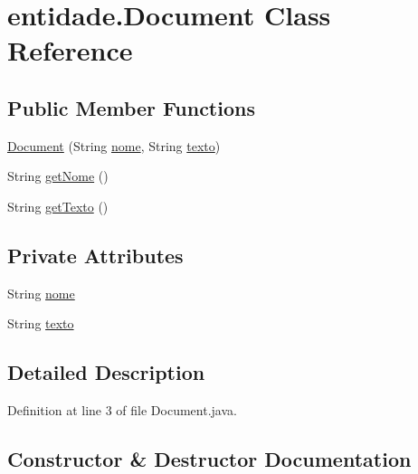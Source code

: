 \hypertarget{classentidade_1_1Document}{}\section{entidade.\+Document Class Reference}
\label{classentidade_1_1Document}
\subsection*{Public Member Functions}
\begin{DoxyCompactItemize}
\item 
\hyperlink{classentidade_1_1Document_a5c4d135e68423bdbfaf7584bc99669f7}{Document} (String \hyperlink{classentidade_1_1Document_ad19a8ea43a8ed7f3a418f7546fa4cd5c}{nome}, String \hyperlink{classentidade_1_1Document_a13324b3f331d617f95a64ad0ff958a94}{texto})
\item 
String \hyperlink{classentidade_1_1Document_aeeee0c94c00c921c2cc9b22bf2337f6c}{get\+Nome} ()
\item 
String \hyperlink{classentidade_1_1Document_abbdb123ed0ae443399b81060a7be9979}{get\+Texto} ()
\end{DoxyCompactItemize}
\subsection*{Private Attributes}
\begin{DoxyCompactItemize}
\item 
String \hyperlink{classentidade_1_1Document_ad19a8ea43a8ed7f3a418f7546fa4cd5c}{nome}
\item 
String \hyperlink{classentidade_1_1Document_a13324b3f331d617f95a64ad0ff958a94}{texto}
\end{DoxyCompactItemize}


\subsection{Detailed Description}


Definition at line 3 of file Document.\+java.



\subsection{Constructor \& Destructor Documentation}
\hypertarget{classentidade_1_1Document_a5c4d135e68423bdbfaf7584bc99669f7}{}\label{classentidade_1_1Document_a5c4d135e68423bdbfaf7584bc99669f7} 
